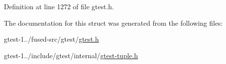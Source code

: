 \-Definition at line 1272 of file gtest.\-h.



\-The documentation for this struct was generated from the following files\-:\begin{DoxyCompactItemize}
\item 
gtest-\/1../fused-\/src/gtest/\hyperlink{fused-src_2gtest_2gtest_8h}{gtest.\-h}\item 
gtest-\/1../include/gtest/internal/\hyperlink{gtest-tuple_8h}{gtest-\/tuple.\-h}\end{DoxyCompactItemize}

